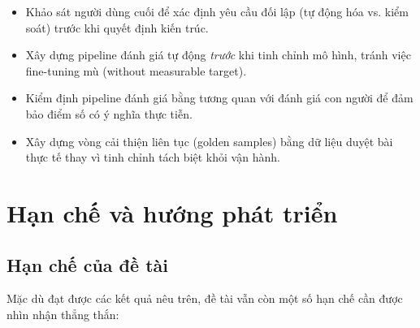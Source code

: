 \begin{itemize}
  \item Khảo sát người dùng cuối để xác định yêu cầu đối lập (tự động
    hóa vs. kiểm soát) trước khi quyết định kiến trúc.
  \item Xây dựng pipeline đánh giá tự động \emph{trước} khi tinh chỉnh
    mô hình, tránh việc fine-tuning mù (without measurable target).
  \item Kiểm định pipeline đánh giá bằng tương quan với đánh giá con
    người để đảm bảo điểm số có ý nghĩa thực tiễn.
  \item Xây dựng vòng cải thiện liên tục (golden samples) bằng dữ
    liệu duyệt bài thực tế thay vì tinh chỉnh tách biệt khỏi vận
    hành.
\end{itemize}

\section{Hạn chế và hướng phát triển}\label{sec:han-che-huong-phat-trien}

\subsection{Hạn chế của đề tài}

Mặc dù đạt được các kết quả nêu trên, đề tài vẫn còn một số hạn chế
cần được nhìn nhận thẳng thắn:

